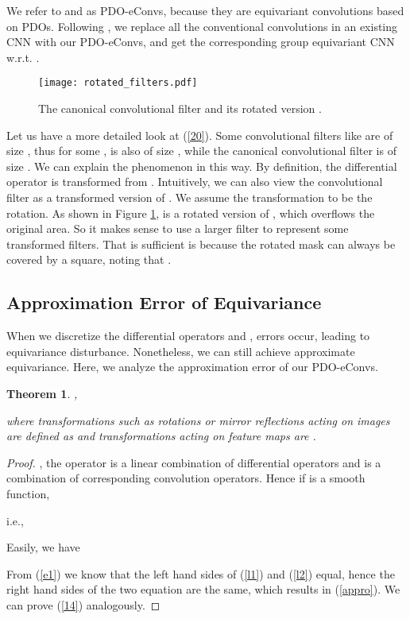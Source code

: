 \documentclass{article}
\newtheorem{theorem}{Theorem}
\newtheorem{proof}{Proof}
\begin{document}
We refer to  and  as PDO-eConvs, because they are equivariant convolutions based on PDOs. Following \cite{cohen2016group}, we replace all the conventional convolutions in an existing CNN with our PDO-eConvs, and get the corresponding group equivariant CNN w.r.t. .

\begin{figure}[t]
	\centering
	\texttt{[image: rotated\_filters.pdf]} \caption{The canonical convolutional filter  and its rotated version .}
	\label{filters}
\end{figure}
Let us have a more detailed look at (\ref{20}). Some convolutional filters like  are of size , thus for some ,  is also of size , while the canonical convolutional filter  is of size . We can explain the phenomenon in this way. By definition, the differential operator  is transformed from . Intuitively, we can also view the convolutional filter  as a transformed version of . We assume the transformation to be the rotation. As shown in Figure \ref{filters},  is a rotated version of , which overflows the original  area. So it makes sense to use a larger filter to represent some transformed filters.
That  is sufficient is because the rotated  mask can always be covered by a  square, noting that .

\subsection{Approximation Error of Equivariance}
When we discretize the differential operators  and , errors occur, leading to equivariance disturbance. Nonetheless, we can still achieve approximate equivariance. Here, we analyze the approximation error of our PDO-eConvs. 



\begin{theorem}
	,
	
	where transformations such as rotations or mirror reflections acting on images are defined as  and transformations acting on feature maps are .
\end{theorem}

\begin{proof}
	, the operator  is a linear combination of differential operators and  is a combination
	of corresponding convolution operators. Hence if  is a smooth function,
	
	i.e.,
	
	Easily, we have
	
From (\ref{e1}) we know that the left hand sides of (\ref{l1}) and (\ref{l2}) equal, hence the right hand sides of the two equation are the same, which results in (\ref{appro}). We can prove (\ref{14}) analogously.  
\end{proof}
\end{document}
